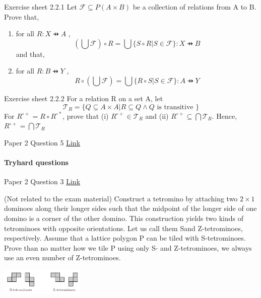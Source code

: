 \documentclass{exam}
\begin{document}
\begin{questions}
\question Exercise sheet 2.2.1 Let $\mathcal{F} \subseteq P(A \times B)$ be a collection of relations from A to B. Prove that,
\begin{enumerate}[label=(\alph*)]
\item for all $R : X \pfun A$ ,
$$(\bigcup \mathcal{F}) \circ R = \bigcup \{S \circ R | S \in \mathcal{ F} \} : X \pfun B	$$
and that,
\item for all $R : B \pfun Y$ ,
$$R \circ (\bigcup \mathcal{F}) = \bigcup \{R \circ S | S \in \mathcal{ F} \} : A \pfun Y	$$
\end{enumerate}

\question Exercise sheet 2.2.2 For a relation R on a set A, let 
$$\mathcal{T}_R = \{Q \subseteq A \times A | R \subseteq Q \wedge Q \text{ is transitive }\}$$ 	
For $R^{\circ+} = R \circ R^{\circ*}$, prove that (i) $R^{\circ+} \in \mathcal{T}_R$ and (ii) $R^{\circ+} \subseteq \bigcap \mathcal{T}_R$. Hence, $R^{\circ+} = \bigcap \mathcal{T}_R$

 Paper 2 Question 5 \href{http://www.cl.cam.ac.uk/teaching/exams/pastpapers/y2007p2q5.pdf}{Link} 

\end{questions}

\paragraph{Tryhard questions}
\begin{questions}
 Paper 2 Question 3 \href{http://www.cl.cam.ac.uk/teaching/exams/pastpapers/y2008p2q3.pdf}{Link} 

\question (Not related to the exam material) Construct a tetromino by attaching two $2\times  1$ dominoes along their longer sides such
that the midpoint of the longer side of one domino is a corner of the other domino. This
construction yields two kinds of tetrominoes with opposite orientations. Let us call them Sand Z-tetrominoes, respectively.
Assume that a lattice polygon P can be tiled with S-tetrominoes. Prove than no matter
how we tile P using only S- and Z-tetrominoes, we always use an even number of Z-tetrominoes.

\includegraphics[width=0.3\textwidth]{tetrominos.PNG}

\end{questions}
\end{document}

